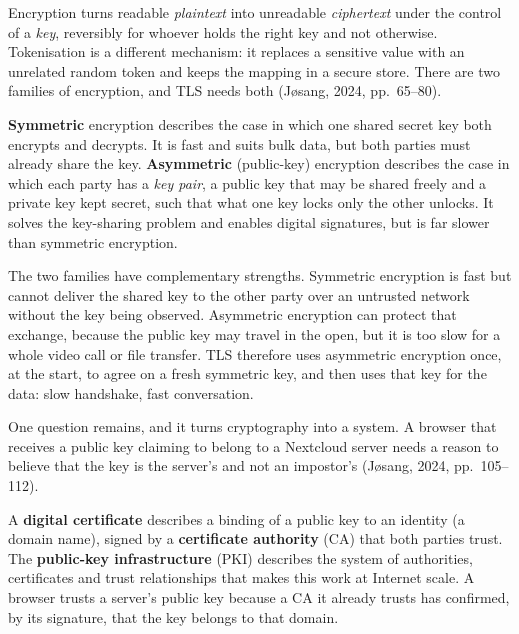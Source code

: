 Encryption turns readable \emph{plaintext} into unreadable \emph{ciphertext}
under the control of a \emph{key}, reversibly for whoever holds the right key
and not otherwise. Tokenisation is a different mechanism: it replaces a
sensitive value with an unrelated random token and keeps the mapping in a
secure store. There are two families of encryption, and TLS needs both
(J\o sang, 2024, pp.~65--80).

\begin{definition}\label{def:crypto}
\textbf{Symmetric} encryption describes the case in which one shared secret
key both encrypts and decrypts. It is fast and suits bulk data, but both
parties must already share the key. \textbf{Asymmetric} (public-key)
encryption describes the case in which each party has a \emph{key pair}, a
public key that may be shared freely and a private key kept secret, such that
what one key locks only the other unlocks. It solves the key-sharing problem
and enables digital signatures, but is far slower than symmetric encryption.
\end{definition}

The two families have complementary strengths. Symmetric encryption is fast
but cannot deliver the shared key to the other party over an untrusted
network without the key being observed. Asymmetric encryption can protect
that exchange, because the public key may travel in the open, but it is too
slow for a whole video call or file transfer. TLS therefore uses asymmetric
encryption once, at the start, to agree on a fresh symmetric key, and then
uses that key for the data: slow handshake, fast conversation.

One question remains, and it turns cryptography into a system. A browser
that receives a public key claiming to belong to a Nextcloud server needs a
reason to believe that the key is the server's and not an impostor's
(J\o sang, 2024, pp.~105--112).

\begin{definition}\label{def:pki}
A \textbf{digital certificate} describes a binding of a public key to an
identity (a domain name), signed by a \textbf{certificate authority} (CA) that
both parties trust. The \textbf{public-key infrastructure} (PKI) describes the
system of authorities, certificates and trust relationships that makes this
work at Internet scale. A browser trusts a server's public key because a CA it
already trusts has confirmed, by its signature, that the key belongs to that
domain.
\end{definition}

